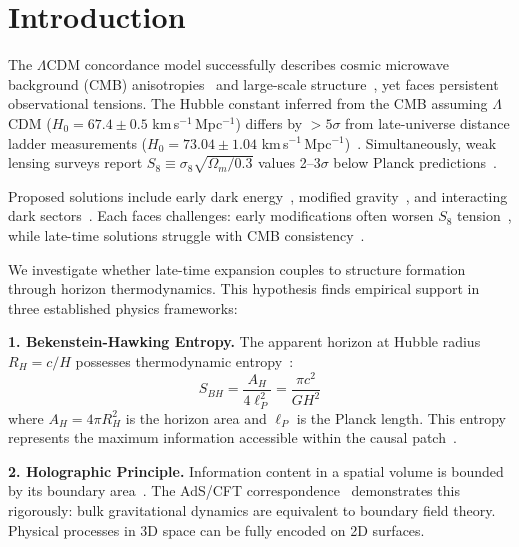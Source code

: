 \documentclass[twocolumn,superscriptaddress,prl,amsmath,amssymb]{revtex4-2}
\begin{document}
\maketitle

\section{Introduction}

The $\Lambda$CDM concordance model successfully describes cosmic microwave background (CMB) anisotropies~\cite{PlanckCollaboration2020} and large-scale structure~\cite{DESI2024}, yet faces persistent observational tensions. The Hubble constant inferred from the CMB assuming $\Lambda$CDM ($H_0 = 67.4 \pm 0.5$ km\,s$^{-1}$\,Mpc$^{-1}$) differs by $>5\sigma$ from late-universe distance ladder measurements ($H_0 = 73.04 \pm 1.04$ km\,s$^{-1}$\,Mpc$^{-1}$)~\cite{Riess2022}. Simultaneously, weak lensing surveys report $S_8 \equiv \sigma_8\sqrt{\Omega_m/0.3}$ values 2--3$\sigma$ below Planck predictions~\cite{KiDS2020,DES2022}.

Proposed solutions include early dark energy~\cite{Kamionkowski2023}, modified gravity~\cite{Amendola2020}, and interacting dark sectors~\cite{DiValentino2021}. Each faces challenges: early modifications often worsen $S_8$ tension~\cite{Hill2020}, while late-time solutions struggle with CMB consistency~\cite{Knox2020}.

We investigate whether late-time expansion couples to structure formation through horizon thermodynamics. This hypothesis finds empirical support in three established physics frameworks:

\textbf{1. Bekenstein-Hawking Entropy.} The apparent horizon at Hubble radius $R_H = c/H$ possesses thermodynamic entropy~\cite{Bekenstein1973,Hawking1975}:
\begin{equation}
S_{BH} = \frac{A_H}{4\ell_P^2} = \frac{\pi c^2}{G H^2}
\label{eq:BH_entropy}
\end{equation}
where $A_H = 4\pi R_H^2$ is the horizon area and $\ell_P$ is the Planck length. This entropy represents the maximum information accessible within the causal patch~\cite{Bousso2002}.

\textbf{2. Holographic Principle.} Information content in a spatial volume is bounded by its boundary area~\cite{tHooft1993,Susskind1995}. The AdS/CFT correspondence~\cite{Maldacena1998} demonstrates this rigorously: bulk gravitational dynamics are equivalent to boundary field theory. Physical processes in 3D space can be fully encoded on 2D surfaces.
\end{document}
